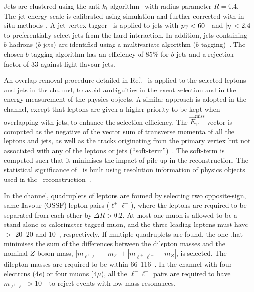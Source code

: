 Jets are clustered using the anti-$k_t$ algorithm~\cite{antikt_algorithm,Fastjet} with radius parameter $R = 0.4$. The jet energy scale is calibrated using simulation and further corrected with in-situ methods~\cite{Aaboud:2017jcu}. 
A jet-vertex tagger~\cite{PERF-2014-03} is applied to jets with $p_{\text{T}}<60$~\GeV\ and $|\eta|<2.4$ to preferentially select jets from the hard interaction. In addition, jets containing $b$-hadrons ($b$-jets) are identified using a multivariate algorithm ($b$-tagging)~\cite{bjets}. The chosen $b$-tagging algorithm has an efficiency of 85\%{} for $b$-jets and a rejection factor of 33 against light-flavour jets.

An overlap-removal procedure detailed in Ref.~\cite{Aad:2016eki} is applied to the selected leptons and jets in the \llvvjj channel,
to avoid ambiguities in the event selection and in the energy measurement of the physics objects.
A similar approach is adopted in the \lllljj channel, except that leptons are given a higher priority to be kept when overlapping with jets, to enhance the selection efficiency.
The $\vec{E}_{\mathrm{T}}^{\mathrm{miss}}$ vector is computed as the negative of the vector sum of transverse momenta of all the leptons and jets, as well as the tracks originating from the primary vertex but not associated with any of the leptons or jets (``soft-term'')~\cite{ATL-PHYS-PUB-2015-027}. The soft-term is computed such that it minimises the impact of pile-up in the \met{} reconstruction. The statistical significance of \met~is built using resolution information of physics objects used in the \met~reconstruction~\cite{ATLAS-CONF-2018-038}.

In the \lllljj channel, quadruplets of leptons are formed by selecting two opposite-sign, same-flavour (OSSF) lepton pairs ($\ell^+\ell^-$), where the leptons are required to be separated from each other by $\Delta R >0.2$.
At most one muon is allowed to be a stand-alone or calorimeter-tagged muon, and the three leading leptons must have \pt{} $>$ 20, 20 and 10~\GeV{}, respectively.
If multiple quadruplets are found, the one that minimises the sum of the differences between the dilepton masses and the nominal $Z$ boson mass,
$|m_{\ell^+\ell^-} - m_Z| + |m_{\ell^{'+}\ell^{'-}} - m_Z|$, is selected.
The dilepton masses are required to be within 66--116~\GeV{}.
In the \lllljj channel with four electrons ($4e$) or four muons ($4\mu$), all the $\ell^+\ell^-$ pairs are required to have $m_{\ell^+\ell^-} > 10$~\GeV{},
to reject events with low mass resonances. 

